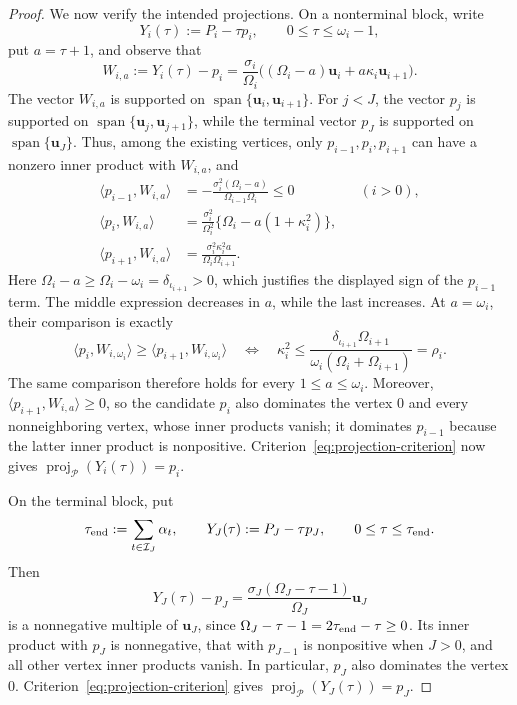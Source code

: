 \documentclass[11pt]{article}
\theoremstyle{definition}
\theoremstyle{remark}
\begin{document}
\begin{proof}
We now verify the intended projections.  On a nonterminal block,
write
\[
 Y_i(\tau):=P_i-\tau p_i,\qquad 0\le \tau\le\omega_i-1,
\]
put \(a=\tau+1\), and observe that
\[
 W_{i,a}:=Y_i(\tau)-p_i
 =\frac{\sigma_i}{\Omega_i}
   \bigl((\Omega_i-a)\mathbf u_i
         +a\kappa_i\mathbf u_{i+1}\bigr).
\]
The vector \(W_{i,a}\) is supported on
\(\operatorname{span}\{\mathbf u_i,\mathbf u_{i+1}\}\).  For \(j<J\),
the vector \(p_j\) is supported on
\(\operatorname{span}\{\mathbf u_j,\mathbf u_{j+1}\}\), while the terminal
vector \(p_J\) is supported on \(\operatorname{span}\{\mathbf u_J\}\).
Thus, among the existing vertices, only \(p_{i-1},p_i,p_{i+1}\) can have a
nonzero inner product with \(W_{i,a}\), and
\[
\begin{aligned}
 \langle p_{i-1},W_{i,a}\rangle
   &=-\frac{\sigma_i^2(\Omega_i-a)}
            {\Omega_{i-1}\Omega_i}\le0
   &&(i>0),\\
 \langle p_i,W_{i,a}\rangle
   &=\frac{\sigma_i^2}{\Omega_i^2}
      \{\Omega_i-a(1+\kappa_i^2)\},\\
 \langle p_{i+1},W_{i,a}\rangle
   &=\frac{\sigma_i^2\kappa_i^2a}
           {\Omega_i\Omega_{i+1}}.
\end{aligned}
\]
Here \(\Omega_i-a\ge\Omega_i-\omega_i=\delta_{\iota_{i+1}}>0\),
which justifies the displayed sign of the \(p_{i-1}\) term.
The middle expression decreases in \(a\), while the last increases.  At
\(a=\omega_i\), their comparison is exactly
\[
 \langle p_i,W_{i,\omega_i}\rangle
 \ge \langle p_{i+1},W_{i,\omega_i}\rangle
 \quad\Longleftrightarrow\quad
 \kappa_i^2
 \le\frac{\delta_{\iota_{i+1}}\Omega_{i+1}}
          {\omega_i(\Omega_i+\Omega_{i+1})}
 =\rho_i.
\]
The same comparison therefore holds for every \(1\le a\le\omega_i\).
Moreover,
\(\langle p_{i+1},W_{i,a}\rangle\ge0\), so the candidate \(p_i\)
also dominates the vertex \(0\) and every nonneighboring vertex, whose
inner products vanish; it dominates \(p_{i-1}\) because the latter inner
product is nonpositive.  Criterion~\eqref{eq:projection-criterion} now
gives \(\operatorname{proj}_{\mathcal P}(Y_i(\tau))=p_i\).

On the terminal block, put
\[
 \tau_{\rm end}:=\sum_{t\in\mathcal I_J}\alpha_t,\qquad
 Y_J(\tau):=P_J-\tau p_J,\qquad 0\le\tau\le\tau_{\rm end}.
\]
Then
\[
 Y_J(\tau)-p_J
 =\frac{\sigma_J(\Omega_J-\tau-1)}{\Omega_J}\mathbf u_J
\]
is a nonnegative multiple of \(\mathbf u_J\), since
\(\Omega_J-\tau-1=2\tau_{\rm end}-\tau\ge0\).  Its inner product with
\(p_J\) is nonnegative, that with \(p_{J-1}\) is nonpositive when \(J>0\),
and all other vertex inner products vanish.  In particular, \(p_J\) also dominates
the vertex \(0\).  Criterion~\eqref{eq:projection-criterion} gives
\(\operatorname{proj}_{\mathcal P}(Y_J(\tau))=p_J\).


\end{proof}
\end{document}
